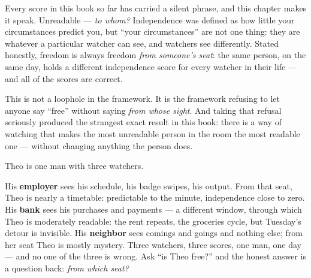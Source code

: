 \renewcommand{\partlist}{\partline{8}{The Watchers}{ch8}\partline{9}{Habits and Coins}{ch9}}\renewcommand{\runninghead}{Watchers: Freedom Is Relative to an Observer}




Every score in this book so far has carried a silent phrase, and this
chapter makes it speak. Unreadable --- \emph{to whom?} Independence was
defined as how little your circumstances predict you, but ``your
circumstances'' are not one thing: they are whatever a particular
watcher can see, and watchers see differently. Stated honestly, freedom
is always freedom \emph{from someone's seat}: the same person, on the same
day, holds a different independence score for every watcher in their
life --- and all of the scores are correct.

This is not a loophole in the framework. It is the framework refusing
to let anyone say ``free'' without saying
\emph{from whose sight}. And taking that refusal seriously produced the
strangest exact result in this book: there is a way of watching that
makes the most unreadable person in the room the most readable one ---
without changing anything the person does.


Theo is one man with three watchers.

His \textbf{employer} sees his schedule, his badge swipes, his output. From
that seat, Theo is nearly a timetable: predictable to the minute,
independence close to zero. His \textbf{bank} sees his purchases and
payments --- a different window, through which Theo is moderately
readable: the rent repeats, the groceries cycle, but Tuesday's detour
is invisible. His \textbf{neighbor} sees comings and goings and nothing
else; from her seat Theo is mostly mystery. Three watchers, three
scores, one man, one day --- and no one of the three is wrong. Ask
``is Theo free?'' and the honest answer is a question back: \emph{from which
seat?}

